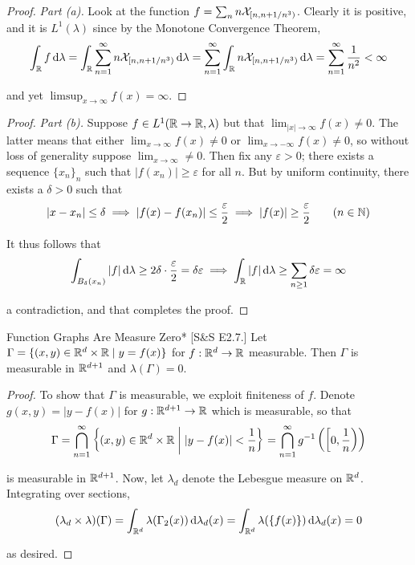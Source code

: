 \begin{proof}
    \textit{Part (a).} Look at the function $f = \sum_{n} n \mathcal{X}_{[n, n+1/n^3)}$. Clearly it is positive, and it is $L^1(\lambda)$ since by the Monotone Convergence Theorem, 
    $$
        \int_{\mathbb{R}} f \, \mathrm{d}\lambda
        = \int_{\mathbb{R}} \sum_{n=1}^\infty n \mathcal{X}_{[n, n + 1/n^3)} \, \mathrm{d}\lambda
        = \sum_{n=1}^\infty \int_{\mathbb{R}} n \mathcal{X}_{[n, n + 1/n^3)} \, \mathrm{d}\lambda
        = \sum_{n=1}^\infty \frac{1}{n^2}
        < \infty
    $$

    and yet $\limsup_{x \to \infty} f(x) = \infty$. 
\end{proof}

\begin{proof}
    \textit{Part (b).} Suppose $f \in L^1(\mathbb{R} \to \mathbb{R}, \lambda)$ but that $\lim_{|x| \to \infty} f(x) \neq 0$. The latter means that either $\lim_{x \to \infty} f(x) \neq 0$ or $\lim_{x \to -\infty} f(x) \neq 0$, so without loss of generality suppose $\lim_{x \to \infty} \neq 0$. Then fix any $\varepsilon > 0$; there exists a sequence $\{x_n\}_n$ such that $|f(x_n)| \geq \varepsilon$ for all $n$. But by uniform continuity, there exists a $\delta > 0$ such that 
    $$
        |x - x_n| \leq \delta \implies |f(x) - f(x_n)| \leq \frac{\varepsilon}{2} \implies |f(x)| \geq \frac{\varepsilon}{2}
        \qquad (n \in \mathbb{N})
    $$

    It thus follows that 
    $$
    \int_{B_{\delta}(x_n)} |f| \, \mathrm{d}\lambda \geq 2\delta \cdot \frac{\varepsilon}{2} = \delta \varepsilon
    \implies \int_{\mathbb{R}} |f| \, \mathrm{d}\lambda \geq \sum_{n \geq 1} \delta \varepsilon = \infty
    $$

    a contradiction, and that completes the proof. 
\end{proof}

\begin{problem}{Function Graphs Are Measure Zero}*
    [S\&S E2.7.] Let $\Gamma = \{(x, y) \in \mathbb{R}^d \times \mathbb{R} \mid y = f(x) \}$ for $f : \mathbb{R}^d \to \mathbb{R}$ measurable. Then $\Gamma$ is measurable in $\mathbb{R}^{d+1}$ and $\lambda(\Gamma) = 0$.
\end{problem}

\begin{proof}
    To show that $\Gamma$ is measurable, we exploit finiteness of $f$. Denote $g(x, y) = |y - f(x)|$ for $g : \mathbb{R}^{d+1} \to \mathbb{R}$ which is measurable, so that
    $$
        \Gamma 
        = \bigcap_{n=1}^\infty \left\{ (x, y) \in \mathbb{R}^d \times \mathbb{R} \;\biggr\rvert\; |y - f(x)| < \frac{1}{n} \right\}
        = \bigcap_{n=1}^\infty g^{-1}\left(\left[0, \frac{1}{n}\right)\right)
    $$

    is measurable in $\mathbb{R}^{d+1}$. Now, let $\lambda_d$ denote the Lebesgue measure on $\mathbb{R}^d$. Integrating over sections, 
    $$
        (\lambda_d \times \lambda)(\Gamma)
        = \int_{\mathbb{R}^d} \lambda(\Gamma_2(x)) \, \mathrm{d}\lambda_d(x)
        = \int_{\mathbb{R}^d} \lambda(\{f(x)\}) \, \mathrm{d}\lambda_d(x)
        = 0
    $$

    as desired. 
\end{proof}

